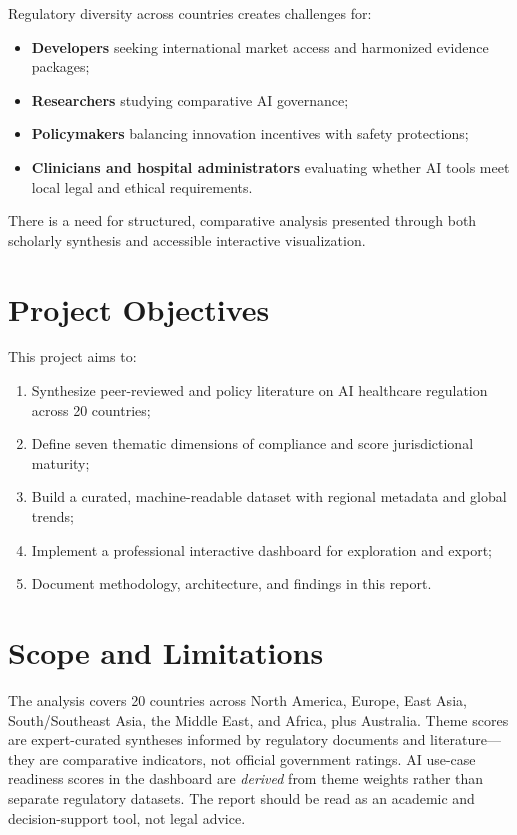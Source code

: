 \documentclass[12pt,a4paper]{report}
\begin{document}
Regulatory diversity across countries creates challenges for:
\begin{itemize}[noitemsep]
  \item \textbf{Developers} seeking international market access and harmonized evidence packages;
  \item \textbf{Researchers} studying comparative AI governance;
  \item \textbf{Policymakers} balancing innovation incentives with safety protections;
  \item \textbf{Clinicians and hospital administrators} evaluating whether AI tools meet local legal and ethical requirements.
\end{itemize}

There is a need for structured, comparative analysis presented through both scholarly synthesis and accessible interactive visualization.

\section{Project Objectives}

This project aims to:
\begin{enumerate}[noitemsep]
  \item Synthesize peer-reviewed and policy literature on AI healthcare regulation across 20 countries;
  \item Define seven thematic dimensions of compliance and score jurisdictional maturity;
  \item Build a curated, machine-readable dataset with regional metadata and global trends;
  \item Implement a professional interactive dashboard for exploration and export;
  \item Document methodology, architecture, and findings in this report.
\end{enumerate}

\section{Scope and Limitations}

The analysis covers 20 countries across North America, Europe, East Asia, South/Southeast Asia, the Middle East, and Africa, plus Australia. Theme scores are expert-curated syntheses informed by regulatory documents and literature---they are comparative indicators, not official government ratings. AI use-case readiness scores in the dashboard are \emph{derived} from theme weights rather than separate regulatory datasets. The report should be read as an academic and decision-support tool, not legal advice.
\end{document}

